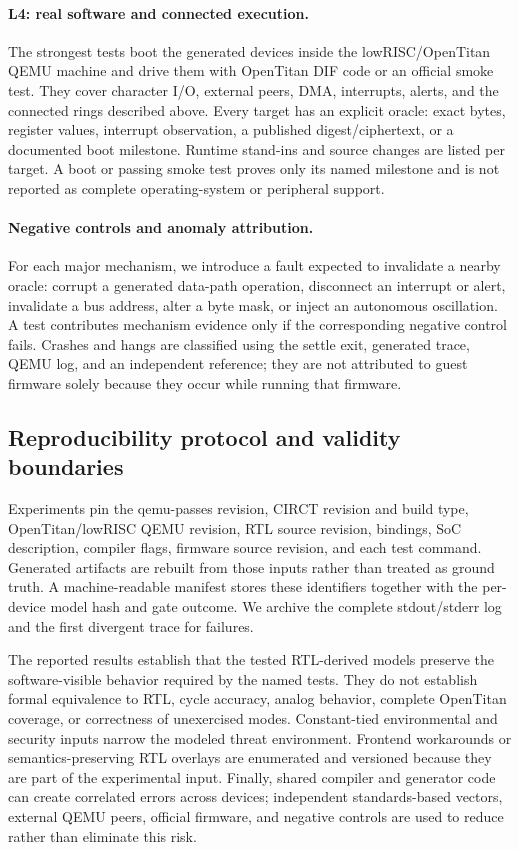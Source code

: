 \paragraph{L4: real software and connected execution.}
The strongest tests boot the generated devices inside the lowRISC/OpenTitan QEMU
machine and drive them with OpenTitan DIF code or an official smoke test.  They
cover character I/O, external peers, DMA, interrupts, alerts, and the connected
rings described above.  Every target has an explicit oracle: exact bytes,
register values, interrupt observation, a published digest/ciphertext, or a
documented boot milestone.  Runtime stand-ins and source changes are listed per
target.  A boot or passing smoke test proves only its named milestone and is not
reported as complete operating-system or peripheral support.

\paragraph{Negative controls and anomaly attribution.}
For each major mechanism, we introduce a fault expected to invalidate a nearby
oracle: corrupt a generated data-path operation, disconnect an interrupt or
alert, invalidate a bus address, alter a byte mask, or inject an autonomous
oscillation.  A test contributes mechanism evidence only if the corresponding
negative control fails.  Crashes and hangs are classified using the settle exit,
generated trace, QEMU log, and an independent reference; they are not attributed
to guest firmware solely because they occur while running that firmware.

\subsection{Reproducibility protocol and validity boundaries}

Experiments pin the qemu-passes revision, CIRCT revision and build type,
OpenTitan/lowRISC QEMU revision, RTL source revision, bindings, SoC description,
compiler flags, firmware source revision, and each test command.  Generated
artifacts are rebuilt from those inputs rather than treated as ground truth.  A
machine-readable manifest stores these identifiers together with the per-device
model hash and gate outcome.  We archive the complete stdout/stderr log and the
first divergent trace for failures.

The reported results establish that the tested RTL-derived models preserve the
software-visible behavior required by the named tests.  They do not establish
formal equivalence to RTL, cycle accuracy, analog behavior, complete OpenTitan
coverage, or correctness of unexercised modes.  Constant-tied environmental and
security inputs narrow the modeled threat environment.  Frontend workarounds or
semantics-preserving RTL overlays are enumerated and versioned because they are
part of the experimental input.  Finally, shared compiler and generator code can
create correlated errors across devices; independent standards-based vectors,
external QEMU peers, official firmware, and negative controls are used to reduce
rather than eliminate this risk.
